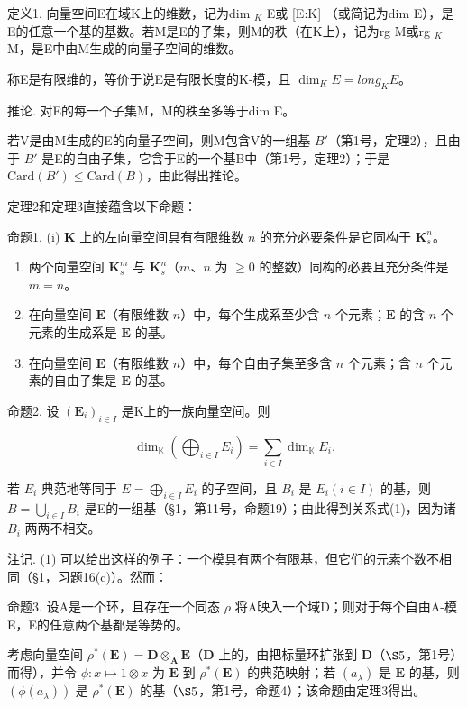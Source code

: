 定义1. 向量空间E在域K上的维数，记为dim \(_{K}\) E或 {[}E:K{]} （或简记为dim E），是E的任意一个基的基数。若M是E的子集，则M的秩（在K上），记为rg M或rg \(_{K}\) M，是E中由M生成的向量子空间的维数。

称E是有限维的，等价于说E是有限长度的K-模，且 \(\dim_{K}E = long_{K}E\)。

推论. 对E的每一个子集M，M的秩至多等于dim E。

若V是由M生成的E的向量子空间，则M包含V的一组基 \(B'\)（第1号，定理2），且由于 \(B'\) 是E的自由子集，它含于E的一个基B中（第1号，定理2）；于是 \(\text{Card}(B') \leqslant \text{Card}(B)\)，由此得出推论。

定理2和定理3直接蕴含以下命题：

命题1. (i) \(\mathbf{K}\) 上的左向量空间具有有限维数 \(n\) 的充分必要条件是它同构于 \(\mathbf{K}_s^n\)。

\begin{enumerate}
\def\labelenumi{(\roman{enumi})}
\setcounter{enumi}{1}
\item
  两个向量空间 \(\mathbf{K}_s^m\) 与 \(\mathbf{K}_s^n\)（\(m\)、\(n\) 为 \(\geqslant 0\) 的整数）同构的必要且充分条件是 \(m = n\)。
\item
  在向量空间 \(\mathbf{E}\)（有限维数 \(n\)）中，每个生成系至少含 \(n\) 个元素；\(\mathbf{E}\) 的含 \(n\) 个元素的生成系是 \(\mathbf{E}\) 的基。
\item
  在向量空间 \(\mathbf{E}\)（有限维数 \(n\)）中，每个自由子集至多含 \(n\) 个元素；含 \(n\) 个元素的自由子集是 \(\mathbf{E}\) 的基。
\end{enumerate}

命题2. 设 \((\mathbf{E}_i)_{i\in I}\) 是K上的一族向量空间。则

\[
\dim_ {\mathbb {K}} \left(\bigoplus_ {i \in I} E _ {i}\right) = \sum_ {i \in I} \dim_ {\mathbb {K}} E _ {i}.\tag{1}
\]

若 \(E_{i}\) 典范地等同于 \(E = \bigoplus_{i \in I} E_{i}\) 的子空间，且 \(B_{i}\) 是 \(E_{i} (i \in I)\) 的基，则 \(B = \bigcup_{i \in I} B_{i}\) 是E的一组基（§1，第11号，命题19）；由此得到关系式(1)，因为诸 \(B_{i}\) 两两不相交。

注记. (1) 可以给出这样的例子：一个模具有两个有限基，但它们的元素个数不相同（§1，习题16(c)）。然而：

命题3. 设A是一个环，且存在一个同态 \(\rho\) 将A映入一个域D；则对于每个自由A-模E，E的任意两个基都是等势的。

考虑向量空间 \(\rho^{*}(\mathbf{E}) = \mathbf{D} \otimes_{\mathbf{A}} \mathbf{E}\)（\(\mathbf{D}\) 上的，由把标量环扩张到 \(\mathbf{D}\)（\(\S 5\)，第1号）而得），并令 \(\phi: x \mapsto 1 \otimes x\) 为 \(\mathbf{E}\) 到 \(\rho^{*}(\mathbf{E})\) 的典范映射；若 \((a_{\lambda})\) 是 \(\mathbf{E}\) 的基，则 \((\phi(a_{\lambda}))\) 是 \(\rho^{*}(\mathbf{E})\) 的基（\(\S 5\)，第1号，命题4）；该命题由定理3得出。

